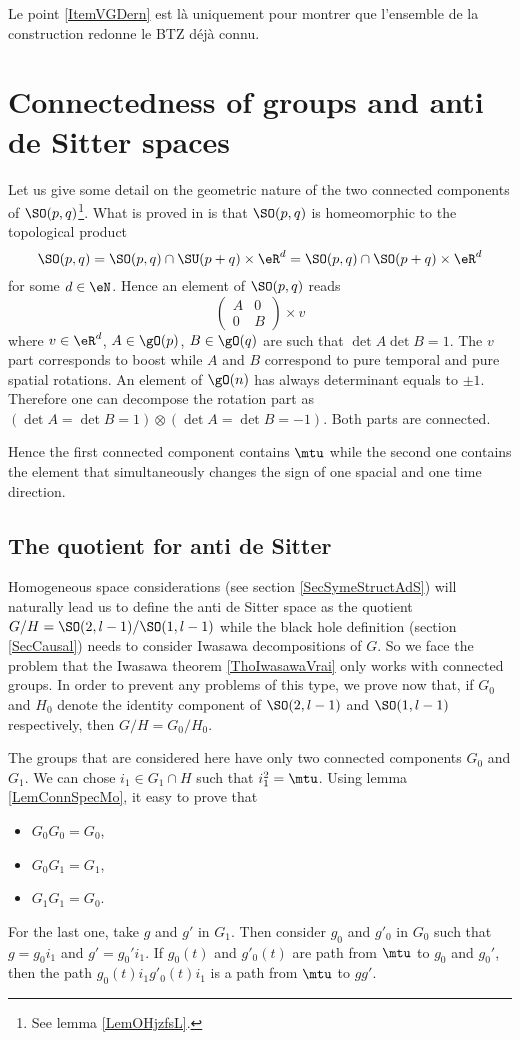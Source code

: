 Le point \ref{ItemVGDern} est là uniquement pour montrer que l'ensemble de la construction redonne le BTZ déjà connu.

\section{Connectedness of groups and anti de Sitter spaces}

\label{PgDisGeoConnSO}Let us give some detail on the geometric nature of the two connected components of $\SO(p,q)$\footnote{See lemma \ref{LemOHjzfsL}.}. What is proved in \cite{HelgasonSym} is that $\SO(p,q)$ is homeomorphic to the topological product
\[ 
  \SO(p,q)=\SO(p,q)\cap\SU(p+q)\times \eR^{d}=\SO(p,q)\cap\SO(p+q)\times \eR^{d}
\]
for some $d\in\eN$. Hence an element of $\SO(p,q)$ reads
\[ 
  \begin{pmatrix}
A&0\\
0&B
\end{pmatrix}\times v
\]
where $v\in\eR^{d}$, $A\in \gO(p)$, $B\in\gO(q)$ are such that $\det A\det B=1$. The $v$ part corresponds to boost while $A$ and $B$ correspond to pure temporal and pure spatial rotations. An element of $\gO(n)$ has always determinant equals to $\pm 1$. Therefore one can decompose the rotation part as $(\det A=\det B=1)\otimes (\det A=\det B=-1)$. Both parts are connected.

Hence the first connected component contains $\mtu$ while the second one contains the element that simultaneously changes the sign of one spacial and one time direction.

\subsection{The quotient for anti de Sitter}

Homogeneous space considerations (see section \ref{SecSymeStructAdS}) will naturally lead us to define the anti de Sitter space as the quotient $G/H=\SO(2,l-1)/\SO(1,l-1)$ while the black hole definition (section \ref{SecCausal}) needs to consider Iwasawa decompositions of $G$. So we face the problem that the Iwasawa theorem \ref{ThoIwasawaVrai} only works with connected groups. In order to prevent any problems of this type, we prove now that, if $G_0$ and $H_0$ denote the identity component of $\SO(2,l-1)$ and $\SO(1,l-1)$ respectively, then $G/H=G_0/H_0$.

The groups that are considered here have only two connected components $G_0$ and $G_1$. We can chose $i_1\in G_1\cap H$ such that $i_1^2=\mtu$. Using lemma \ref{LemConnSpecMo}, it easy to prove that 
\begin{itemize}
\item $G_0G_0=G_0$,
\item $G_0G_1=G_1$,
\item $G_1G_1=G_0$.
\end{itemize}
For the last one, take $g$ and $g'$ in $G_1$. Then consider $g_0$ and $g'_0$ in $G_0$ such that $g=g_0i_1$ and $g'=g_0'i_1$. If $g_0(t)$ and $g'_0(t)$ are path from $\mtu$ to $g_0$ and $g_0'$, then the path $g_0(t)i_1g'_0(t)i_1$ is a path from $\mtu$ to $gg'$.


